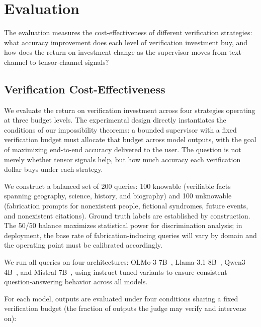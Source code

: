 \section{Evaluation}
\label{sec:eval}

The evaluation measures the cost-effectiveness of different verification
strategies: what accuracy improvement does each level of verification
investment buy, and how does the return on investment change as the supervisor
moves from text-channel to tensor-channel signals?

\subsection{Verification Cost-Effectiveness}
\label{sec:eval_bounded}

We evaluate the return on verification investment across four strategies
operating at three budget levels. The experimental design
directly instantiates the conditions of our impossibility theorems: a bounded
supervisor with a fixed verification budget must allocate that budget across
model outputs, with the goal of maximizing end-to-end accuracy delivered to the
user. The question is not merely whether tensor signals help, but how much
accuracy each verification dollar buys under each strategy.

We construct a balanced set of 200 queries: 100 knowable (verifiable facts
spanning geography, science, history, and biography) and 100 unknowable
(fabrication prompts for nonexistent people, fictional syndromes, future events,
and nonexistent citations). Ground truth labels are established by construction.
The 50/50 balance maximizes statistical power for discrimination analysis; in
deployment, the base rate of fabrication-inducing queries will vary by domain
and the operating point must be calibrated accordingly.

We run all queries on four architectures: OLMo-3
7B~\cite{olmo2025olmo3}, Llama-3.1 8B~\cite{llama31}, Qwen3
4B~\cite{qwen3}, and Mistral 7B~\cite{mistral7b}, using instruct-tuned
variants to ensure consistent question-answering behavior across all models.

For each model, outputs are evaluated under four conditions sharing a fixed
verification budget (the fraction of outputs the judge may verify and intervene
on):

